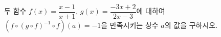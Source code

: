 \hspace*{2mm}\begin{minipage}[t]{\dimexpr\linewidth-2mm\relax}\vspace{0pt}
두 함수 $f(x)=\dfrac{x-1}{x+1}$, $g(x)=\dfrac{-3x+2}{2x-3}$에 대하여 $(f\circ(g\circ f)^{-1}\circ f)(a)=-1$을 만족시키는 상수 $a$의 값을 구하시오.\end{minipage}

